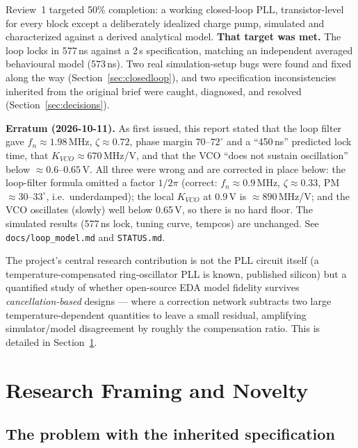 \documentclass[11pt]{article}
\begin{document}
Review~1 targeted 50\% completion: a working closed-loop PLL, transistor-level for every block except a deliberately idealized charge pump, simulated and characterized against a derived analytical model. \textbf{That target was met.} The loop locks in 577\,ns against a 2\,\textmu s specification, matching an independent averaged behavioural model (573\,ns). Two real simulation-setup bugs were found and fixed along the way (Section~\ref{sec:closedloop}), and two specification inconsistencies inherited from the original brief were caught, diagnosed, and resolved (Section~\ref{sec:decisions}).

\medskip
\noindent\textbf{Erratum (2026-10-11).} As first issued, this report stated that the loop filter gave $f_n \approx 1.98$\,MHz, $\zeta \approx 0.72$, phase margin $70$--$72^\circ$ and a ``450\,ns'' predicted lock time, that $K_{VCO}\approx 670$\,MHz/V, and that the VCO ``does not sustain oscillation'' below $\approx 0.6$--$0.65$\,V. All three were wrong and are corrected in place below: the loop-filter formula omitted a factor $1/2\pi$ (correct: $f_n \approx 0.9$\,MHz, $\zeta \approx 0.33$, PM $\approx 30$--$33^\circ$, i.e.\ underdamped); the local $K_{VCO}$ at 0.9\,V is $\approx 890$\,MHz/V; and the VCO oscillates (slowly) well below 0.65\,V, so there is no hard floor. The simulated results (577\,ns lock, tuning curve, tempcos) are unchanged. See \texttt{docs/loop\_model.md} and \texttt{STATUS.md}.

\begin{finding}
The project's central research contribution is not the PLL circuit itself (a temperature-compensated ring-oscillator PLL is known, published silicon) but a quantified study of whether open-source EDA model fidelity survives \emph{cancellation-based} designs --- where a correction network subtracts two large temperature-dependent quantities to leave a small residual, amplifying simulator/model disagreement by roughly the compensation ratio. This is detailed in Section~\ref{sec:novelty}.
\end{finding}

\section{Research Framing and Novelty}
\label{sec:novelty}

\subsection{The problem with the inherited specification}
\end{document}
